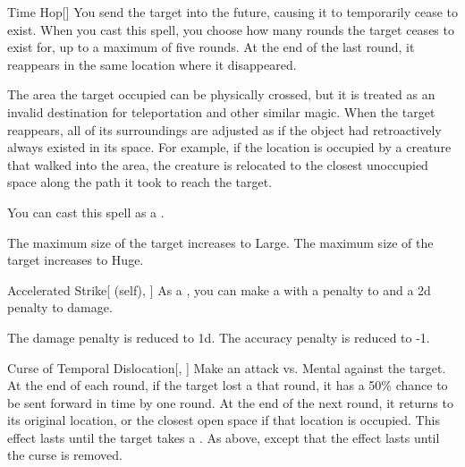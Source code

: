 \lowercase{\hypertarget{spell:Time Hop}{}}\label{spell:Time Hop}
\begin{freeability}[Rank 3]{\hypertarget{spell:Time Hop}{Time Hop}}[]
You send the target into the future, causing it to temporarily cease to exist.
When you cast this spell, you choose how many rounds the target ceases to exist for, up to a maximum of five rounds.
At the end of the last round, it reappears in the same location where it disappeared.

The area the target occupied can be physically crossed, but it is treated as an invalid destination for teleportation and other similar magic.
When the target reappears, all of its surroundings are adjusted as if the object had retroactively always existed in its space.
For example, if the location is occupied by a creature that walked into the area, the creature is relocated to the closest unoccupied space along the path it took to reach the target.

You can cast this spell as a .

\rankline
{} The maximum size of the target increases to Large.
 The maximum size of the target increases to Huge.
\end{freeability}
\vspace{0.25em}



\lowercase{\hypertarget{spell:Accelerated Strike}{}}\label{spell:Accelerated Strike}
\begin{attuneability}[Rank 4]{\hypertarget{spell:Accelerated Strike}{Accelerated Strike}}[ (self), ]
As a , you can make a  with a  penalty to  and a \minus2d penalty to damage.

\rankline
{} The damage penalty is reduced to \minus1d.
 The accuracy penalty is reduced to -1.
\end{attuneability}
\vspace{0.25em}



\lowercase{\hypertarget{spell:Curse of Temporal Dislocation}{}}\label{spell:Curse of Temporal Dislocation}
\begin{freeability}[Rank 4]{\hypertarget{spell:Curse of Temporal Dislocation}{Curse of Temporal Dislocation}}[, ]
Make an attack vs. Mental against the target.
\hit At the end of each round, if the target lost a  that round, it has a 50\% chance to be sent forward in time by one round.
At the end of the next round, it returns to its original location, or the closest open space if that location is occupied.
This effect lasts until the target takes a .
\crit As above, except that the effect lasts until the curse is removed.
\end{freeability}
\vspace{0.25em}



